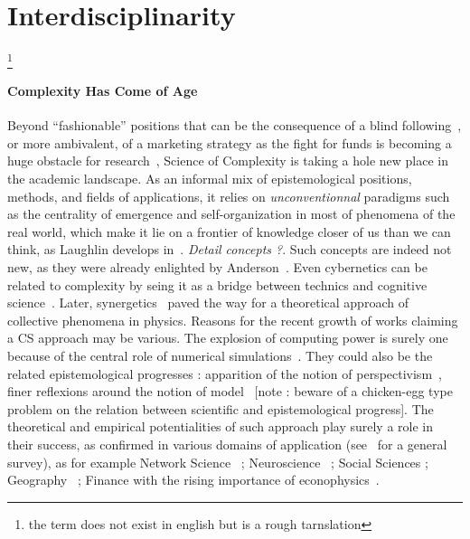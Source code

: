 \section*{Interdisciplinarity}
\footnote{the term does not exist in english but is a rough tarnslation}


\paragraph{Complexity Has Come of Age}


Beyond ``fashionable'' positions that can be the consequence of a blind following~\cite{dirk1999measure}, or more ambivalent, of a marketing strategy as the fight for funds is becoming a huge obstacle for research~\cite{bollen2014funding}, Science of Complexity is taking a hole new place in the academic landscape.
As an informal mix of epistemological positions, methods, and fields of applications, it relies on \emph{unconventionnal} paradigms such as the centrality of emergence and self-organization in most of phenomena of the real world, which make it lie on a frontier of knowledge closer of us than we can think, as Laughlin develops in~\cite{laughlin2006different}. \textit{Detail concepts ?}. Such concepts are indeed not new, as they were already enlighted by Anderson~\cite{anderson1972more}. Even cybernetics can be related to complexity by seing it as a bridge between technics and cognitive science~\cite{wiener1948cybernetics}. Later, synergetics~\cite{haken1980synergetics} paved the way for a theoretical approach of collective phenomena in physics. Reasons for the recent growth of works claiming a CS approach may be various. The explosion of computing power is surely one because of the central role of numerical simulations~\cite{varenne2010simulations}. They could also be the related epistemological progresses : apparition of the notion of perspectivism~\cite{giere2010scientific}, finer reflexions around the notion of model~\cite{varenne2013modeliser} [note : beware of a chicken-egg type problem on the relation between scientific and epistemological progress]. The theoretical and empirical potentialities of such approach play surely a role in their success, as confirmed in various domains of application (see~\cite{newman2011complex} for a general survey), as for example Network Science~\cite{barabasi2002linked} ; Neuroscience~\cite{koch1999complexity} ; Social Sciences  ; Geography~\cite{manson2001simplifying}\cite{pumain1997pour} ; Finance with the rising importance of econophysics~\cite{stanley1999econophysics}.




